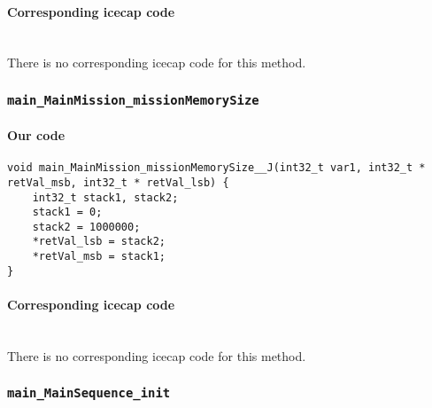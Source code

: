 \paragraph{Corresponding icecap code}\hfill\\
There is no corresponding icecap code for this method.

\subsubsection{\texttt{main\_MainMission\_missionMemorySize}}

\paragraph{Our code}\hfill
\begin{lstlisting}[firstnumber=1407]
void main_MainMission_missionMemorySize__J(int32_t var1, int32_t * retVal_msb, int32_t * retVal_lsb) {
	int32_t stack1, stack2;
	stack1 = 0;
	stack2 = 1000000;
	*retVal_lsb = stack2;
	*retVal_msb = stack1;
}
\end{lstlisting}

\paragraph{Corresponding icecap code}\hfill\\
There is no corresponding icecap code for this method.

\subsubsection{\texttt{main\_MainSequence\_init}}

